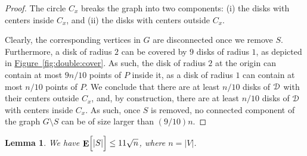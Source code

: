 \documentclass[12pt]{article}
\newtheorem{lemma}[theorem]{Lemma}
\theoremstyle{remark}\theoremheaderfont{\sf}\theorembodyfont{\upshape}\newtheorem{defn}[theorem]{Definition}
\newcommand{\HLink}[2]{\hyperref[#2]{#1~\ref*{#2}}}
\newcommand{\lemlab}[1]{\label{lemma:#1}}
\newcommand{\figlab}[1]{\label{fig:#1}}
\newcommand{\figref}[1]{\HLink{Figure}{fig:#1}}
\newcommand{\PPicCapLab}[4][]{
   \settowidth{\ppicwd}{\texttt{[image: \{\#2]}}} \begin{minipage}{\ppicwd}
       {\texttt{[image: \{\#2]}}}\vspace{-0.3cm}\captionof{figure}{}
       \figlab{#4}
   \end{minipage}}
\newlength{\ppicwd}
\newcommand{\DSet}{\EuScript{D}}\newcommand{\PntSet}{{P}}\newcommand{\disk}{\mathsf{d}}\newcommand{\diskA}{\mathsf{f}}\newcommand{\diskB}{\mathsf{u}}\newcommand{\diskC}{\mathsf{v}}\newcommand{\pnt}{\mathsf{p}}\newcommand{\pntA}{\mathsf{q}}\newcommand{\pntB}{\mathsf{t}}\newcommand{\AreaX}[1]{\mathrm{area}\pth{#1}}
\newcommand{\Graph}{{G}}
\newcommand{\pth}[1]{\mleft({#1}\mright)}
\newcommand{\Ex}[2][\!]{\mathop{\mathbf{E}}#1\pbrcx{#2}}
\newcommand{\cardin}[1]{\left| {#1} \right|}\newcommand{\norm}[1]{\left\| {#1} \right\|}
\newcommand{\pbrcx}[1]{\left[ {#1} \right]}
\begin{document}
\begin{proof}
    The circle $C_x$ breaks the graph into two components: (i) the
    disks with centers inside $C_x$, and (ii) the disks with centers
    outside $C_x$.

    \parpic[r]{\PPicCapLab[scale=0.97]{figs/double}{}{double:cover}}

    Clearly, the corresponding vertices in $\Graph$ are disconnected
    once we remove $S$. Furthermore, a disk of radius $2$ can be
    covered by $9$ disks of radius $1$, as depicted in
    \figref{double:cover}. As such, the disk of radius $2$ at the
    origin can contain at most $9n/10$ points of $\PntSet$ inside it,
    as a disk of radius $1$ can contain at most $n/10$ points of
    $\PntSet$. We conclude that there are at least $n/10$ disks of
    $\DSet$ with their centers outside $C_x$, and, by construction,
    there are at least $n/10$ disks of $\DSet$ with centers inside
    $C_x$. As such, once $S$ is removed, no connected component of the
    graph $\Graph \setminus S$ can be of size larger than $(9/10)n$.
\end{proof}


\begin{lemma}
    \lemlab{small}We have $\Ex{\MakeSBig\! \cardin{S}} \leq 11 \sqrt{n}$, where
    $n = \cardin{V}$.
\end{lemma}
\end{document}

